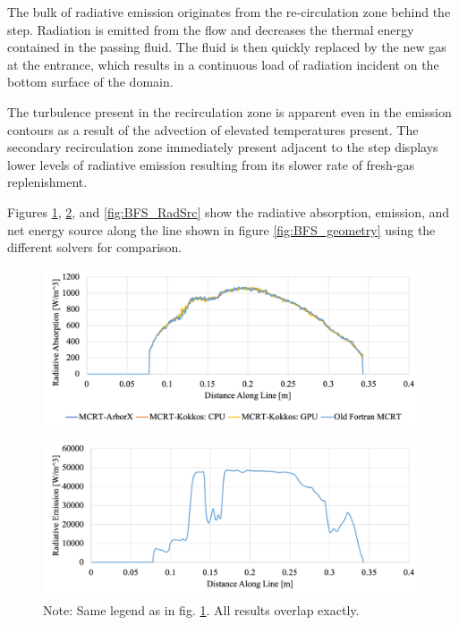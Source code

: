 The bulk of radiative emission originates from the re-circulation zone behind the step. Radiation is emitted from the flow and decreases the thermal energy contained in the passing fluid. 
The fluid is then quickly replaced by the new gas at the entrance, which results in a continuous load of radiation incident on the bottom surface of the domain. 

The turbulence present in the recirculation zone is apparent even in the emission contours as a result of the advection of elevated temperatures present. The secondary recirculation zone immediately present adjacent to the step displays lower levels of radiative emission resulting from its slower rate of fresh-gas replenishment.

Figures \ref{fig:BFS_RadAbs}, \ref{fig:BFS_RadEmi}, and \ref{fig:BFS_RadSrc} show the radiative absorption, emission, and net energy source along the line shown in figure \ref{fig:BFS_geometry} using the different solvers for comparison. 

\begin{figure}[!ht]
\includegraphics[width=\linewidth]{figures/ch4/LineComparison_RadAbs.png}
\caption{}
\label{fig:BFS_RadAbs}
\end{figure}

\begin{figure}[!ht]
\includegraphics[width=\linewidth]{figures/ch4/LineComparison_RadEmi.png}
\caption{Note: Same legend as in fig. \ref{fig:BFS_RadAbs}. All results overlap exactly.}
\label{fig:BFS_RadEmi}
\end{figure}

